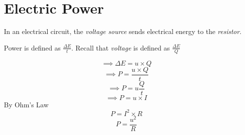 \documentclass[11pt,twoside]{article}
\begin{document}
	\section{Electric Power}
		In an electrical circuit, the \emph{voltage source} sends electrical energy to the \emph{resistor}.
		
		Power is defined as $\frac{\Delta E}{t}$. Recall that \emph{voltage} is defined as $\frac{\Delta E}{Q}$
		\begin{center}
			\[ \implies \Delta E = u \times Q \]
			\[ \implies P = \frac{u \times Q}{t} \]
			\[ \implies P = u \frac{Q}{t} \]
			\[ \implies P = u \times I \]
			By Ohm's Law
			\[ P = I^2 \times R \]
			\[ P = \frac{u^2}{R} \]
		\end{center}
\end{document}
